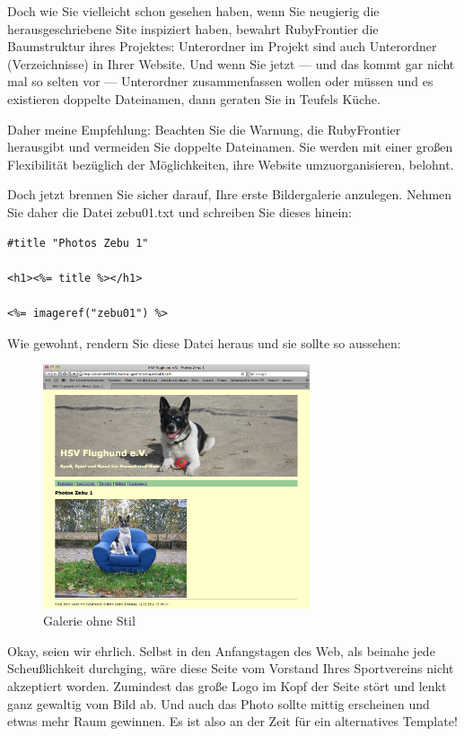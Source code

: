 \documentclass[11pt]{report}
\begin{document}
Doch wie Sie vielleicht schon gesehen haben, wenn Sie neugierig die
herausgeschriebene Site inspiziert haben, bewahrt RubyFrontier die
Baumstruktur ihres Projektes: Unterordner im Projekt sind auch
Unterordner (Verzeichnisse) in Ihrer Website. Und wenn Sie jetzt — und
das kommt gar nicht mal so selten vor — Unterordner zusammenfassen
wollen oder müssen und es existieren doppelte Dateinamen, dann geraten
Sie in Teufels Küche.


Daher meine Empfehlung: Beachten Sie die Warnung, die RubyFrontier
herausgibt und vermeiden Sie doppelte Dateinamen. Sie werden mit einer
großen Flexibilität bezüglich der Möglichkeiten, ihre Website
umzuorganisieren, belohnt.


Doch jetzt brennen Sie sicher darauf, Ihre erste Bildergalerie
anzulegen. Nehmen Sie daher die Datei zebu01.txt und schreiben Sie
dieses hinein:


\begin{verbatim}
#title "Photos Zebu 1"

<h1><%= title %></h1>

<%= imageref("zebu01") %>
\end{verbatim}

Wie gewohnt, rendern Sie diese Datei heraus und sie sollte so aussehen:


\begin{figure}[h!]
\centering
\includegraphics[width=0.7\textwidth]{./images/galerie03.png}
\caption{\label{galerie03}Galerie ohne Stil}
\end{figure}

Okay, seien wir ehrlich. Selbst in den Anfangstagen des Web, als
beinahe jede Scheußlichkeit durchging, wäre diese Seite vom Vorstand
Ihres Sportvereins nicht akzeptiert worden. Zumindest das große Logo
im Kopf der Seite stört und lenkt ganz gewaltig vom Bild ab. Und auch
das Photo sollte mittig erscheinen und etwas mehr Raum gewinnen. Es
ist also an der Zeit für ein alternatives Template!
\end{document}
